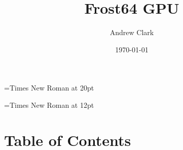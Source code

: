 \documentclass{article}
\begin{document}
	\font\titlefont={Times New Roman} at 20pt
	\title{{\titlefont Frost64 GPU}}

	\font\bottomtextfont={Times New Roman} at 12pt
	\date{{\bottomtextfont} \today}
	\author{{\bottomtextfont Andrew Clark}}

	\setmainfont{Times New Roman}
	\setmonofont{Courier New}

	\maketitle

	\newpage



\section{Table of Contents}
	\tableofcontents
	\newpage
\end{document}
